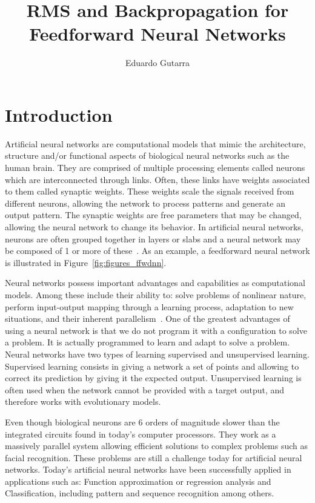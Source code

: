 \documentclass[11pt]{article}
\title{RMS and Backpropagation for Feedforward Neural Networks}
\author{Eduardo Gutarra}
\begin{document}
	
\ifpdf
{}
\else
{}
\fi
	
\maketitle
	
\section{Introduction} %
\label{sec:introduction}

Artificial neural networks are computational models that mimic the architecture, structure and/or functional aspects of biological
neural networks such as the human brain. They are comprised of multiple processing elements called neurons which are interconnected
through links. Often, these links have weights associated to them called synaptic weights. These weights scale the signals received from
different neurons, allowing the network to process patterns and generate an output pattern. The synaptic weights are free parameters
that may be changed, allowing the neural network to change its behavior. In artificial neural networks, neurons are often grouped
together in layers or slabs and a neural network may be composed of 1 or more of these~\cite{skapura}. As an example, a feedforward
neural network is illustrated in Figure~\ref{fig:figures_ffwdnn}.

Neural networks possess important advantages and capabilities as computational models. Among these include their ability to: solve
problems of nonlinear nature, perform input-output mapping through a learning process, adaptation to new situations, and their inherent
parallelism~\cite{Haykin:1994:NNC:541500}. One of the greatest advantages of using a neural network is that we do not program it with a
configuration to solve a problem. It is actually programmed to learn and adapt to solve a problem. Neural networks have two types of
learning supervised and unsupervised learning. Supervised learning consists in giving a network a set of points and allowing to correct
its prediction by giving it the expected output. Unsupervised learning is often used when the network cannot be provided with a target
output, and therefore works with evolutionary models.

Even though biological neurons are 6 orders of magnitude slower than the integrated circuits found in today's computer processors. They
work as a massively parallel system allowing efficient solutions to complex problems such as facial recognition. These problems are
still a challenge today for artificial neural networks. Today's artificial neural networks have been successfully applied in
applications such as: Function approximation or regression analysis and Classification, including pattern and sequence recognition among
others.
\end{document}
